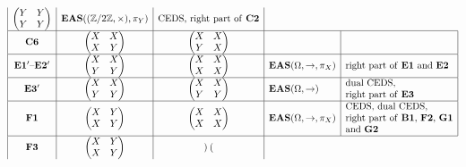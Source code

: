\documentclass[pdftex]{sigma}
\numberwithin{equation}{section}
\newcommand{\eas}{\mathbf{EAS}}
\begin{document}
$$\begin{array}{|c|c|c|l|l|}
\begin{pmatrix}
Y&Y\\Y&Y
\end{pmatrix}&\eas((\mathbb{Z}/2\mathbb{Z},\times),\pi_Y)&\text{CEDS, right part of \textbf{C2}}\\
\hline \mathbf{C6}&\begin{pmatrix}
X&X\\X&Y
\end{pmatrix}&
\begin{pmatrix}
X&X\\Y&X
\end{pmatrix}&&\\
\hline \mathbf{E1'}\text{--}\mathbf{E2'}&\begin{pmatrix}
X&X\\Y&Y
\end{pmatrix}&
\begin{pmatrix}
X&X\\X&X
\end{pmatrix}&\eas(\Omega,\rightarrow,\pi_X)&\text{right part of \textbf{E1} and \textbf{E2}}\\
\hline \mathbf{E3'}&\begin{pmatrix}
X&X\\Y&Y
\end{pmatrix}&
\begin{pmatrix}
X&X\\Y&Y
\end{pmatrix}&\eas(\Omega,\rightarrow)&\begin{array}{@{}l@{}}\text{dual CEDS},\\
\text{right part of \textbf{E3}}\end{array}\\
\hline\mathbf{ F1}&\begin{pmatrix}
X&Y\\X&Y
\end{pmatrix}&
\begin{pmatrix}
X&X\\X&X
\end{pmatrix}&\eas(\Omega,\rightarrow,\pi_X)&\begin{array}{@{}l@{}}\text{CEDS, dual CEDS},\\
\text{right part of \textbf{B1}, \textbf{F2}, \textbf{G1}}\\
\text{and \textbf{G2}}\end{array}\\
\hline \mathbf{F3}&\begin{pmatrix}
X&Y\\X&Y
\end{pmatrix}&
\begin{pmatrix}

\end{pmatrix}
\end{array}$$
\end{document}
